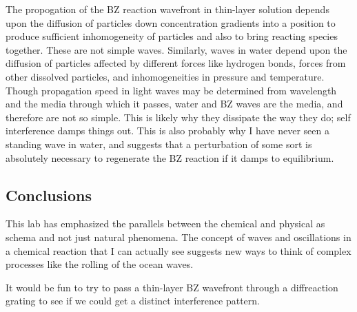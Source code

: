 \documentclass{article}
\begin{document}
The propogation of the BZ reaction wavefront in thin-layer solution depends upon 
the diffusion of particles down concentration gradients into a position to produce
sufficient inhomogeneity of particles and also to bring reacting species together. These are
not simple waves. Similarly, waves in water depend upon the diffusion of particles affected
by different forces like hydrogen bonds, forces from other dissolved particles, and
inhomogeneities in pressure and temperature. Though propagation speed in light waves may
be determined from wavelength and the media through which it passes, water and BZ waves
are the media, and therefore are not so simple. This is likely why they dissipate the way they
do; self interference damps things out. This is also probably why I have never seen a 
standing wave in water, and suggests that a perturbation of some sort is absolutely 
necessary to regenerate the BZ reaction if it damps to equilibrium.

\subsection{Conclusions}

This lab has emphasized the parallels between the chemical and physical as
schema and not just natural phenomena. The concept of waves and oscillations in a chemical
reaction that I can actually see suggests new ways to think of complex processes like the 
rolling of the ocean waves.

It would be fun to try to pass a thin-layer BZ wavefront through a diffreaction grating to see 
if we could get a distinct interference pattern.




\end{document}
